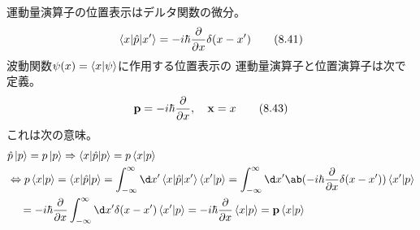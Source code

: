 運動量演算子の位置表示はデルタ関数の微分。
\begin{equation}
  \label{eq:p_in_x}
  \braket{x|\hat{p}|x'}
  =-i\hbar\pdv{}{x}\delta(x-x')
  \tag{8.41}
\end{equation}
波動関数$\psi(x)=\braket{x|\psi}$に作用する位置表示の
運動量演算子と位置演算子は次で定義。
\begin{equation}
  \vb{p}=-i\hbar\pdv{}{x},\quad
  \vb{x}=x
  \tag{8.43}
\end{equation}
これは次の意味。
\begin{equation}
  \begin{split}
    &\hat{p}\ket{p}=p\ket{p}
    \Rightarrow
    \braket{x|\hat{p}|p}
    =p\braket{x|p} \\
    &\Leftrightarrow
    p\braket{x|p}
    =\braket{x|\hat{p}|p}
    =\int_{-\infty}^\infty\d x'
    \braket{x|\hat{p}|x'}\braket{x'|p}
    =\int_{-\infty}^\infty\d x'
    \ab(-i\hbar\pdv{}{x}\delta(x-x'))\braket{x'|p} \\
    &\quad\,=
    -i\hbar\pdv{}{x}
    \int_{-\infty}^\infty\d x'
    \delta(x-x')\braket{x'|p}
    =-i\hbar\pdv{}{x}\braket{x|p}
    =\vb{p}\braket{x|p}
  \end{split}
\end{equation}